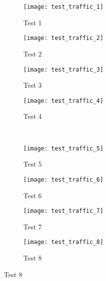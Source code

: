 \begin{figure}
\caption{Experiment Traffic Flows}
\label{fig:testnum_flows}
\centering
\begin{subfigure}[b]{0.245\linewidth}
	\centering
	\caption{Test 1}
	\texttt{[image: test\_traffic\_1]}
\end{subfigure}
\begin{subfigure}[b]{0.245\linewidth}
	\centering
	\caption{Test 2}
	\texttt{[image: test\_traffic\_2]}
\end{subfigure}
\begin{subfigure}[b]{0.245\linewidth}
	\centering
	\caption{Test 3}
	\texttt{[image: test\_traffic\_3]}
\end{subfigure}
\begin{subfigure}[b]{0.245\linewidth}
	\centering
	\caption{Test 4}
	\texttt{[image: test\_traffic\_4]}
\end{subfigure}
\\
\begin{subfigure}[b]{0.245\linewidth}
	\centering
	\caption{Test 5}
	\texttt{[image: test\_traffic\_5]}
\end{subfigure}
\begin{subfigure}[b]{0.245\linewidth}
	\centering
	\caption{Test 6}
	\texttt{[image: test\_traffic\_6]}
\end{subfigure}
\begin{subfigure}[b]{0.245\linewidth}
	\centering
	\caption{Test 7}
	\texttt{[image: test\_traffic\_7]}
\end{subfigure}
\begin{subfigure}[b]{0.245\linewidth}
	\centering
	\caption{Test 8}
	\texttt{[image: test\_traffic\_8]}
\end{subfigure}
\end{figure}

